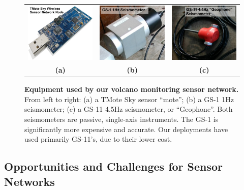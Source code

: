 \begin{figure}[t]
\begin{center}
\begin{tabular}{ccc}
\includegraphics[width=0.3\hsize]{./2-related/figs/TMoteSky.pdf} &
\includegraphics[width=0.3\hsize]{./2-related/figs/GS1.pdf} &
\includegraphics[width=0.3\hsize]{./2-related/figs/GS11.pdf} \\
\textbf{(a)} & \textbf{(b)} & \textbf{(c)} \\
\end{tabular}
\end{center}

\caption{\textbf{Equipment used by our volcano monitoring sensor network.}
From left to right: (a) a TMote Sky sensor ``mote''; (b) a GS-1 1Hz
seismometer; (c) a GS-11 4.5Hz seismometer, or ``Geophone''. Both
seismometers are passive, single-axis instruments. The GS-1 is significantly
more expensive and accurate. Our deployments have used primarily GS-11's, due
to their lower cost.}

\label{introduction-fig-equipment}
\end{figure}

\vspace*{0.05in}

\subsection{Opportunities and Challenges for Sensor Networks}

